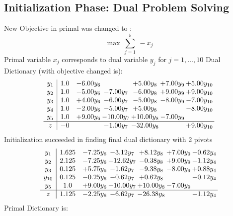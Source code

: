 \documentclass[9pt]{article}
\begin{document}
\subsection{Initialization Phase: Dual Problem Solving}
New Objective in primal was changed to : \[ \max\ \sum_{j=1}^{5}\ - x_j \] 
Primal variable $x_j$ corresponds to dual variable $y_j$ for $j = 1,\ldots,10$
Dual Dictionary (with objective changed is): 
\[\begin{array}{c| c c@{\hskip 2pt} c@{\hskip 2pt} c@{\hskip 2pt} c@{\hskip 2pt} c@{\hskip 2pt} }
 y_{1}   &  1.0 & -6.00 y_{6} &   & +  5.00 y_{8} & +  7.00 y_{9} & +  5.00 y_{10}\\
 y_{2}   &  1.0 & -5.00 y_{6} & -7.00 y_{7} & -6.00 y_{8} & +  9.00 y_{9} & +  9.00 y_{10}\\
 y_{3}   &  1.0 & +  4.00 y_{6} & -6.00 y_{7} & -5.00 y_{8} & -8.00 y_{9} & -7.00 y_{10}\\
 y_{4}   &  1.0 & -2.00 y_{6} & -5.00 y_{7} & +  5.00 y_{8} &   & -8.00 y_{10}\\
 y_{5}   &  1.0 & +  9.00 y_{6} & -10.00 y_{7} & + 10.00 y_{8} & -7.00 y_{9} &   \\
\hline
z    &  -0  &   & -1.00 y_{7} & -32.00 y_{8} &   & +  9.00 y_{10}\\
\end{array}\]
Initialization succeeded in finding final dual dictionary with 2 pivots
\[\begin{array}{c| c c@{\hskip 2pt} c@{\hskip 2pt} c@{\hskip 2pt} c@{\hskip 2pt} c@{\hskip 2pt} }
 y_{1}   &  1.625 & -7.25 y_{6} & -3.12 y_{7} & +  8.12 y_{8} & +  7.00 y_{9} & -0.62 y_{4}\\
 y_{2}   &  2.125 & -7.25 y_{6} & -12.62 y_{7} & -0.38 y_{8} & +  9.00 y_{9} & -1.12 y_{4}\\
 y_{3}   &  0.125 & +  5.75 y_{6} & -1.62 y_{7} & -9.38 y_{8} & -8.00 y_{9} & +  0.88 y_{4}\\
 y_{10}   &  0.125 & -0.25 y_{6} & -0.62 y_{7} & +  0.62 y_{8} &   & -0.12 y_{4}\\
 y_{5}   &  1.0 & +  9.00 y_{6} & -10.00 y_{7} & + 10.00 y_{8} & -7.00 y_{9} &   \\
\hline
z    &  1.125 & -2.25 y_{6} & -6.62 y_{7} & -26.38 y_{8} &   & -1.12 y_{4}\\
\end{array}\]
Primal Dictionary is:
\end{document}
